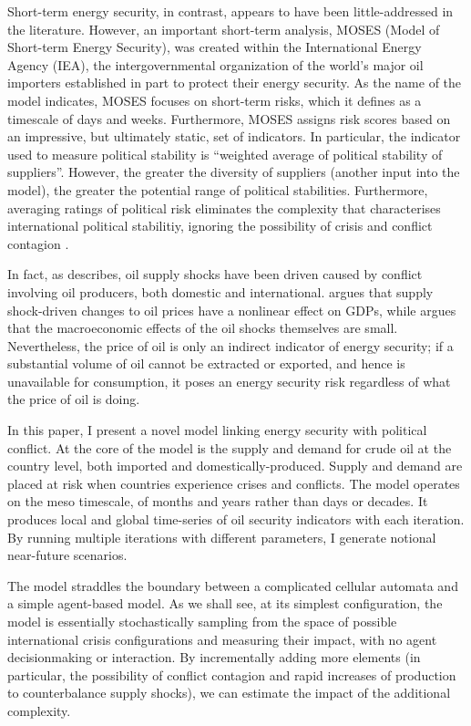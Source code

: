 \documentclass{article}
\begin{document}
Short-term energy security, in contrast, appears to have been little-addressed in the literature. However, an important short-term analysis, MOSES (Model of Short-term Energy Security), was created within the International Energy Agency (IEA), the intergovernmental organization of the world's major oil importers established in part to protect their energy security. As the name of the model indicates, MOSES focuses on short-term risks, which it defines as a timescale of days and weeks. Furthermore, MOSES assigns risk scores based on an impressive, but ultimately static, set of indicators. In particular, the indicator used to measure political stability is ``weighted average of political stability of suppliers''. However, the greater the diversity of suppliers (another input into the model), the greater the potential range of political stabilities. Furthermore, averaging ratings of political risk eliminates the complexity that characterises international political stabilitiy, ignoring the possibility of crisis and conflict contagion \citep{}. 

In fact, as \citet{hamilton_2003} describes, oil supply shocks have been driven caused by conflict involving oil producers, both domestic and international. \citet{hamilton_2003} argues that supply shock-driven changes to oil prices have a nonlinear effect on GDPs, while \citet{killian_2008} argues that the macroeconomic effects of the oil shocks themselves are small. Nevertheless, the price of oil is only an indirect indicator of energy security; if a substantial volume of oil cannot be extracted or exported, and hence is unavailable for consumption, it poses an energy security risk regardless of what the price of oil is doing. 

In this paper, I present a novel model linking energy security with political conflict. At the core of the model is the supply and demand for crude oil at the country level, both imported and domestically-produced. Supply and demand are placed at risk when countries experience crises and conflicts. The model operates on the meso timescale, of months and years rather than days or decades.  It produces local and global time-series of oil security indicators with each iteration. By running multiple iterations with different parameters, I generate notional near-future scenarios.  

The model straddles the boundary between a complicated cellular automata and a simple agent-based model. As we shall see, at its simplest configuration, the model is essentially stochastically sampling from the space of possible international crisis configurations and measuring their impact, with no agent decisionmaking or interaction. By incrementally adding more  elements (in particular, the possibility of conflict contagion and rapid increases of production to counterbalance supply shocks), we can estimate the impact of the additional complexity. 
\end{document}
